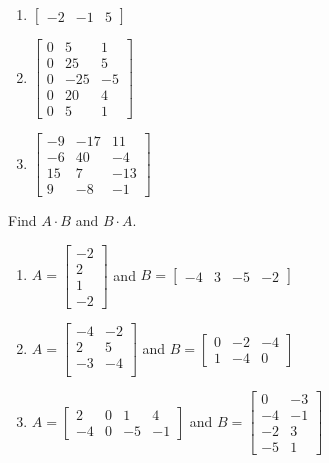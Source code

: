 \begin{Answer}[ref = mult_mat1]
\begin{enumerate}
    \item $\begin{bmatrix}
        -2 & -1 & 5
    \end{bmatrix}$
    \item $\begin{bmatrix}
        0 & 5 & 1\\
        0 & 25 & 5\\
        0 & -25 & -5\\
        0 & 20 & 4\\
        0 & 5 & 1
    \end{bmatrix}$
    \item $\begin{bmatrix}
        -9 & -17 & 11\\
        -6 & 40 & -4\\
        15 & 7 & -13\\
        9 & -8 & -1
    \end{bmatrix}$
\end{enumerate}
\end{Answer}

\begin{Exercise}[title = {Multiplying Matrices 2}, label = mult_mat2]
Find $\mathbf{\mathit{A}} \cdot \mathbf{\mathit{B}}$ and $\mathbf{\mathit{B}} \cdot \mathbf{\mathit{A}}$.
\begin{enumerate}
\item $\mathbf{\mathit{A}} = \begin{bmatrix}
-2\\
2\\
1\\
-2
\end{bmatrix}$ and $\mathbf{\mathit{B}} = \begin{bmatrix}
-4 & 3 & -5 & -2
\end{bmatrix}$
\item $\mathbf{\mathit{A}} = \begin{bmatrix}
-4 & -2\\
2 & 5\\
-3 & -4\\
\end{bmatrix}$ and $\mathbf{\mathit{B}} = \begin{bmatrix}
0 & -2 & -4\\
1 & -4 & 0
\end{bmatrix}$
\item $\mathbf{\mathit{A}} = \begin{bmatrix}
2 & 0 & 1 & 4\\
-4 & 0 & -5 & -1
\end{bmatrix}$ and $\mathbf{\mathit{B}} = \begin{bmatrix}
0 & -3\\
-4 & -1\\
-2 & 3\\
-5 & 1
\end{bmatrix}$
\end{enumerate}
\end{Exercise}


